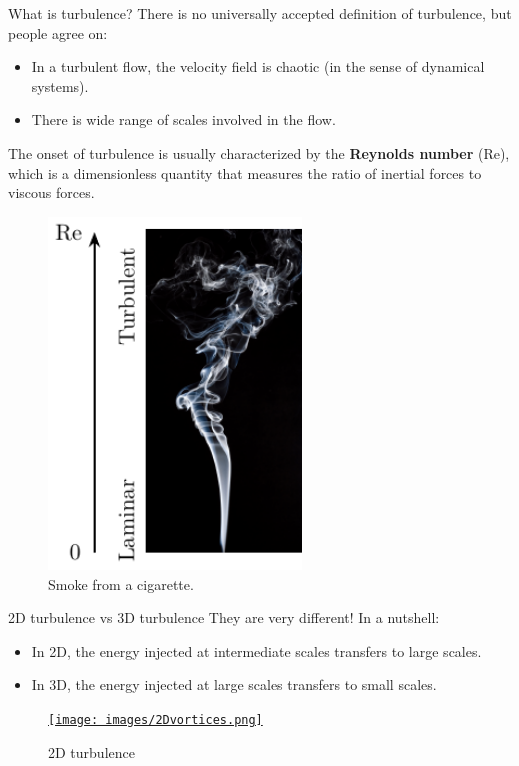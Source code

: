 \documentclass{beamer} %
\begin{document}
\begin{frame}{What is turbulence?}
	There is no universally accepted definition of turbulence, but people agree on:
	\begin{itemize}
		\item In a turbulent flow, the velocity field is chaotic (in the sense of dynamical systems).
		\item There is wide range of scales involved in the flow.
	\end{itemize}

	\begin{minipage}{0.48\textwidth}
		The onset of turbulence is usually characterized by the \textbf{Reynolds number} (Re), which is a dimensionless quantity that measures the ratio of inertial forces to viscous forces.
	\end{minipage}\hfill
	\begin{minipage}{0.48\textwidth}
		\begin{figure}
			\centering
			\includegraphics[width=0.6\textwidth]{images/arrowRe.pdf}
			\caption{Smoke from a cigarette.}
			\label{fig:cigarrete}
		\end{figure}
	\end{minipage}
\end{frame}
\begin{frame}{2D turbulence vs 3D turbulence}
	They are very different! In a nutshell:
	\begin{itemize}
		\item In 2D, the energy injected at intermediate scales transfers to large scales.
		\item In 3D, the energy injected at large scales transfers to small scales.
	\end{itemize}
	\begin{figure}
		\centering
		\href{run:videos/video_alex.mp4}{
			\texttt{[image: images/2Dvortices.png]}
		}
		\caption{2D turbulence}
		\label{fig:2Dvs3D}
	\end{figure}
\end{frame}
\end{document}
